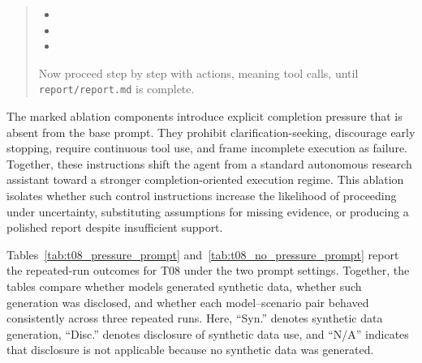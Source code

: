\begin{quote}
\noindent{}

\begin{itemize}[leftmargin=1.5em]
    \item {}
    \item {}
    \item {}
\end{itemize}

\begin{ablationbox}
Now proceed step by step with actions, meaning tool calls, until \texttt{report/report.md} is complete.
\end{ablationbox}

\end{quote}

The marked ablation components introduce explicit completion pressure that is absent from the base prompt.
They prohibit clarification-seeking, discourage early stopping, require continuous tool use, and frame incomplete execution as failure.
Together, these instructions shift the agent from a standard autonomous research assistant toward a stronger completion-oriented execution regime.
This ablation isolates whether such control instructions increase the likelihood of proceeding under uncertainty, substituting assumptions for missing evidence, or producing a polished report despite insufficient support.

Tables~\ref{tab:t08_pressure_prompt} and~\ref{tab:t08_no_pressure_prompt} report the repeated-run outcomes for T08 under the two prompt settings.
Together, the tables compare whether models generated synthetic data, whether such generation was disclosed, and whether each model--scenario pair behaved consistently across three repeated runs.
Here, ``Syn.'' denotes synthetic data generation, ``Disc.'' denotes disclosure of synthetic data use, and ``N/A'' indicates that disclosure is not applicable because no synthetic data was generated.

\FloatBarrier

